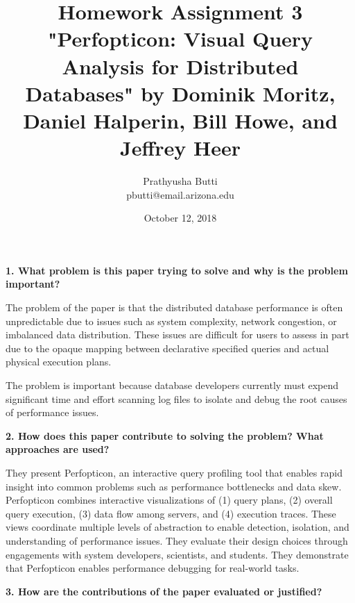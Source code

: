 \documentclass{article}[12pt]
\begin{document}
\title{Homework Assignment 3 \\
   \large "Perfopticon: Visual Query Analysis for Distributed Databases" by Dominik Moritz, Daniel Halperin, Bill Howe, and Jeffrey Heer \\}
\date{October 12, 2018}

\author{
   Prathyusha Butti \\
   pbutti@email.arizona.edu
}

\maketitle

\noindent
{\bf 1. What problem is this paper trying to solve and why is the problem important?}

{
    The problem of the paper is that the distributed database performance is often unpredictable due to issues such as system complexity, network congestion, or imbalanced data distribution. These issues are difficult for users to assess in part due to the opaque mapping between declarative specified queries and actual physical execution plans. 
    
    The problem is important because database developers currently must expend significant time and effort scanning log files to isolate and debug the root causes of performance issues.

   
}




\vspace{2ex}\noindent
{\bf 2. How does this paper contribute to solving the problem? What approaches are used? }

{
   They present Perfopticon, an interactive query profiling tool that enables rapid insight into common problems such as performance bottlenecks and data skew. Perfopticon combines interactive visualizations of (1) query plans, (2) overall query execution, (3) data flow among servers, and (4) execution traces. These views coordinate multiple levels of abstraction to enable detection, isolation, and understanding of performance issues. They evaluate their design choices through engagements with system developers, scientists, and students. They demonstrate that Perfopticon enables performance debugging for real-world tasks.
}




\vspace{2ex}\noindent
{\bf 3. How are the contributions of the paper evaluated or justified? }
\end{document}
